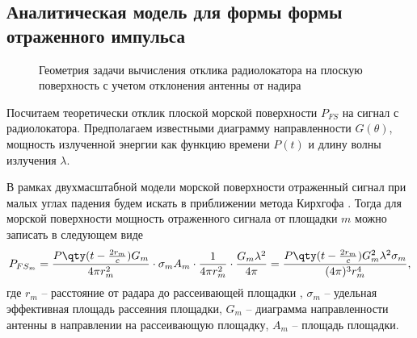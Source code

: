 \subsection{Аналитическая модель для формы формы отраженного импульса}


\begin{figure}[h]
    \centering
    \def\svgwidth{0.8\linewidth}
    
    \caption{Геометрия задачи вычисления отклика радиолокатора на плоскую
    поверхность с учетом отклонения антенны от надира}
    \label{fig:geometry}
\end{figure}
Посчитаем теоретически отклик плоской морской поверхности $P_{FS}$ на сигнал с
радиолокатора.
Предполагаем известными диаграмму направленности $G(\theta)$, мощность
излученной энергии как функцию времени $P(t)$ и длину волны излучения
$\lambda$.




В рамках двухмасштабной  модели морской поверхности отраженный сигнал при малых
углах падения будем искать в приближении метода Кирхгофа \cite{bass-and-fuks}.
Тогда для морской поверхности мощность отраженного сигнала от площадки $m$ можно записать в
следующем виде
\begin{equation}
    \label{eq:Pfsm}
    P_{FS_m} = 
    \frac
        {P\qty(t - \frac{2r_m}{c}) G_m}
        {4 \pi r_m^2} 
    \cdot \sigma_mA_m
    \cdot \frac{1}{4 \pi r_m^2} 
    \cdot \frac{G_m \lambda^2}{4 \pi}=
    \frac
        {P\qty(t - \frac{2r_m}{c})G_m^2 \lambda^2 \sigma_m}
        {(4 \pi)^3 r_{m}^4},
\end{equation} 
где 
$r_m$ -- расстояние от радара до рассеивающей площадки ,
$\sigma_m$ -- удельная эффективная площадь рассеяния площадки,
$G_m$ -- диаграмма направленности антенны в направлении на рассеивающую
площадку,
$A_m$ -- площадь площадки.

